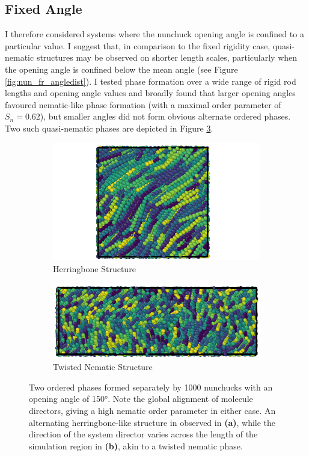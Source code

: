 \documentclass[11pt, a4paper]{article} %
\begin{document}
\subsection{Fixed Angle}
I therefore considered systems where the nunchuck opening angle is confined to a particular value. I suggest that, in comparison to the fixed rigidity case, quasi-nematic structures may be observed on shorter length scales, particularly when the opening angle is confined below the mean angle (see Figure \ref{fig:nun_fr_angledist}).
I tested phase formation over a wide range of rigid rod lengths and opening angle values and broadly found that larger opening angles favoured nematic-like phase formation (with a maximal order parameter of $S_{n} = 0.62$), but smaller angles did not form obvious alternate ordered phases. Two such quasi-nematic phases are depicted in Figure \ref{fig:nun_fa_views}.

\begin{figure}
	\vspace{0.5cm}
	\centering
	\begin{subfigure}{.4\textwidth}
		\centering
		\includegraphics[width=.9\linewidth]{Figures/nun_fa_herringbone}
		\caption{Herringbone Structure}
		\label{fig:nun_fa_herringbone}
	\end{subfigure}%
	\begin{subfigure}{.6\textwidth}
		\centering
		\includegraphics[width=.9\linewidth]{Figures/nun_fa_twist}
		\caption{Twisted Nematic Structure}
		\label{fig:nun_fa_twist}
	\end{subfigure}
	\caption{Two ordered phases formed separately by \num{1000} nunchucks with an opening angle of \ang{150}. Note the global alignment of molecule directors, giving a high nematic order parameter in either case. An alternating herringbone-like structure in observed in \textbf{(a)}, while the direction of the system director varies across the length of the simulation region in \textbf{(b)}, akin to a twisted nematic phase.}
	\label{fig:nun_fa_views}
\end{figure}
\end{document}
